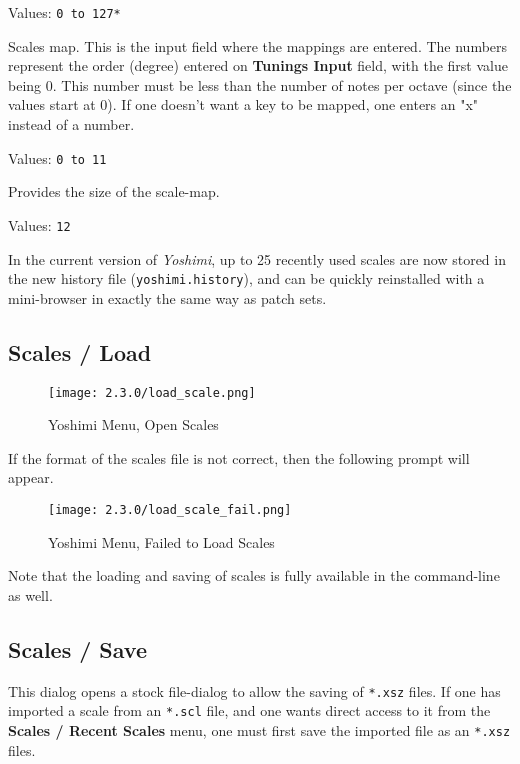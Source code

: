    Values: \texttt{0 to 127*}

   Scales map.  This is the input field where the mappings are entered.
   The numbers represent the order (degree) entered on
   \textbf{Tunings Input} field, with the first value being 0.
   This number must be less than the number of notes per octave (since
   the values start at 0).
   If one doesn't want a key to be mapped, one enters an "x" instead of a
   number.

   Values: \texttt{0 to 11}

   Provides the size of the scale-map.

   Values: \texttt{12}

   In the current version of \textsl{Yoshimi}, up to 25 recently used scales are
   now stored in the new history file
   (\texttt{yoshimi.history}), and can be quickly reinstalled with a
   mini-browser in exactly the same way as patch sets.

\subsection{Scales / Load}
\label{subsec:scales_load}

\begin{figure}[H]
   \centering
   \texttt{[image: 2.3.0/load\_scale.png]}
   \caption{Yoshimi Menu, Open Scales}
   \label{fig:yoshimi_open_scales}
\end{figure}

   If the format of the scales file is not correct, then the following prompt
   will appear.

\begin{figure}[H]
   \centering
   \texttt{[image: 2.3.0/load\_scale\_fail.png]}
   \caption{Yoshimi Menu, Failed to Load Scales}
   \label{fig:yoshimi_failed_to_load_scales}
\end{figure}

   Note that the loading and saving of scales is fully available in the
   command-line as well.

\subsection{Scales / Save}
\label{subsec:scales_save}

   This dialog opens a stock file-dialog to allow the saving of
   \texttt{*.xsz} files.
   If one has imported a scale from an \texttt{*.scl} file, and one
   wants direct access to it from the \textbf{Scales / Recent Scales} menu, one
   must first save the imported file as an \texttt{*.xsz} files.

